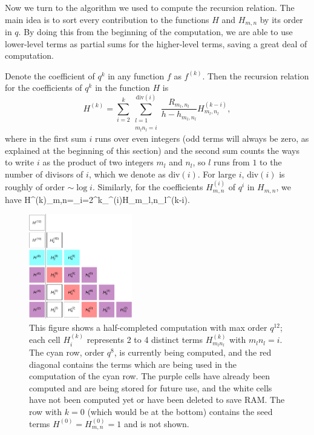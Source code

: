 Now we turn to the algorithm we used to compute the recursion relation. The main idea is to sort every contribution to the functions $H$ and $H_{m,n}$ by its order in $q$. By doing this from the beginning of the computation, we are able to use lower-level terms as partial sums for the higher-level terms, saving a great deal of computation.

Denote the coefficient of $q^k$ in any function $f$ as $f^{(k)}$. Then the recursion relation for the coefficients of $q^k$ in the function $H$ is
\begin{equation}\label{eq:recursion1}
	H^{(k)} = \sum_{i=2}^k \sum_{\substack{l=1\\m_ln_l=i}}^{\text{div}(i)} \frac{R_{m_l,n_l}}{h - h_{m_l,n_l}} H_{m_l,n_l}^{(k-i)},
\end{equation}
where in the first sum $i$ runs over even integers (odd terms will always be zero, as explained at the beginning of this section) and the second sum counts the ways to write  $i$ as the product of two integers $m_l$ and $n_l$, so $l$ runs from $1$ to the number of divisors of $i$, which we denote as $\text{div}(i)$. For large $i$, $\text{div}(i)$ is roughly of order $\sim \log i$. Similarly, for the coefficients $H^{(i)}_{m,n}$ of $q^i$ in $H_{m,n}$, we have
\be\label{eq:recursion2}
H^{(k)}_{m,n}=\sum_{i=2}^k\sum_{}^{(i)}H_{m_l,n_l}^{(k-i)}.
\ee
\begin{figure}
\centering
\includegraphics[width=0.4\textwidth]{virasoro_chapter/HTriangle.pdf}
	\caption{This figure shows a half-completed computation with max order $q^{12}$; each cell $H^{(k)}_i$ represents 2 to 4 distinct terms $H^{(k)}_{m_ln_l}$ with $m_ln_l=i$. The cyan row, order $q^8$, is currently being computed, and the red diagonal contains the terms which are being used in the computation of the cyan row. The purple cells have already been computed and are being stored for future use, and the white cells have not been computed yet or have been deleted to save RAM. The row with $k=0$ (which would be at the bottom) contains the seed terms $H^{(0)}=H^{(0)}_{m,n}=1$ and is not shown.}
\label{fig:HTriangle}
\end{figure}

